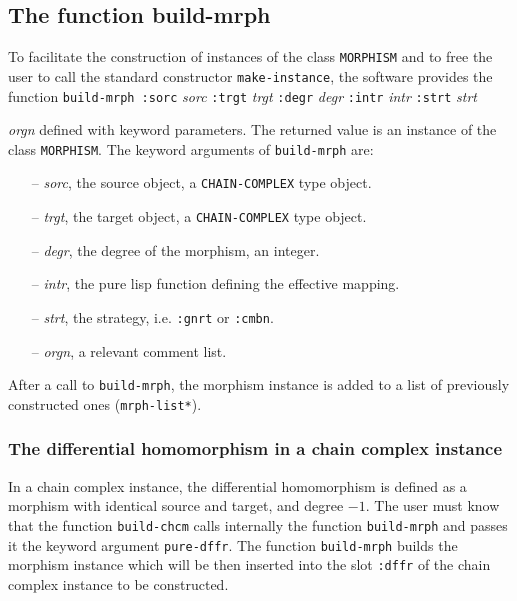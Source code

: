 \subsection {The function build-mrph}

To facilitate the construction of instances of the class {\tt MORPHISM} and to free  the user to call
the standard constructor {\tt make-instance}, the software provides the function
\vskip 0.35cm
{\tt build-mrph :sorc} {\em sorc} {\tt :trgt} {\em trgt} {\tt :degr} {\em degr} {\tt :intr} {\em intr}
{\tt :strt} {\em strt} \par
\hspace*{22.5mm}{\tt :orgn} {\em orgn}
\vskip 0.35cm
defined with keyword parameters. The returned value is an instance of the class {\tt MORPHISM}.
The keyword arguments of {\tt build-mrph} are:

\begin{itemize}
\item [--] {\em sorc}, the source object, a {\tt CHAIN-COMPLEX} type object.
\item [--] {\em trgt}, the target object, a {\tt CHAIN-COMPLEX} type object.
\item [--] {\em degr}, the degree of the morphism, an integer.
\item [--] {\em intr}, the pure lisp function defining the effective mapping.
\item [--] {\em strt}, the strategy, i.e. {\tt :gnrt} or {\tt :cmbn}.
\item [--] {\em orgn}, a relevant comment list.
\end{itemize}

After a call to {\tt build-mrph}, the morphism instance
is added to a list of previously constructed  ones ({\tt *mrph-list*}).

\subsubsection {The differential homomorphism in a chain complex instance}

In a  chain complex instance, the differential homomorphism is defined as a morphism
with identical source and target, and degree $-1$. The user must know that the  function {\tt build-chcm}
calls internally the function {\tt build-mrph} and passes it the keyword argument
{\tt pure-dffr}. The function {\tt build-mrph} builds
the  morphism instance which will be then inserted into the slot {\tt :dffr} of the chain complex instance
to be constructed.


